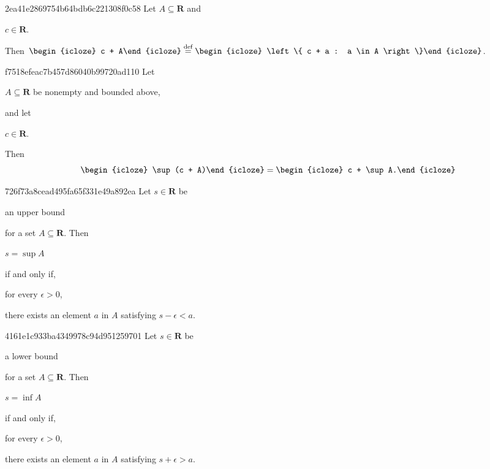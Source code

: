 \begin{note}{2ea41e2869754b64bdb6c221308f0c58}
    Let \({ A \subseteq \mathbf{R} }\) and \begin{icloze}{3}\({ c \in \mathbf{R} }\).\end{icloze}
    Then \({ \begin{icloze}{2}c + A\end{icloze} \overset{\text{def}}= \begin{icloze}{1}\left\{ c + a : a \in A \right\}\end{icloze} }\).
\end{note}

\begin{note}{f7518efeac7b457d86040b99720ad110}
    Let \begin{icloze}{2}\({ A \subseteq \mathbf{R} }\) be nonempty and bounded above,\end{icloze} and let \begin{icloze}{4}\({ c \in \mathbf{R} }\).\end{icloze}
    Then
    \[
        \begin{icloze}{3}\sup(c + A)\end{icloze} = \begin{icloze}{1}c + \sup A.\end{icloze}
    \]
\end{note}

\begin{note}{726f73a8cead495fa65f331e49a892ea}
    Let \({ s \in \mathbf{R} }\) be \begin{icloze}{5}an upper bound\end{icloze} for a set \({ A \subseteq \mathbf{R} }\).
    Then \begin{icloze}{3}\({ s = \sup A }\)\end{icloze} \begin{icloze}{4}if and only if,\end{icloze} \begin{icloze}{2}for every \({ \epsilon > 0 }\),\end{icloze} \begin{icloze}{1}there exists an element \({ a }\) in \({ A }\) satisfying \({ s - \epsilon < a }\).\end{icloze}
\end{note}

\begin{note}{4161e1c933ba4349978c94d951259701}
    Let \({ s \in \mathbf{R} }\) be \begin{icloze}{5}a lower bound\end{icloze} for a set \({ A \subseteq \mathbf{R} }\).
    Then \begin{icloze}{3}\({ s = \inf A }\)\end{icloze} \begin{icloze}{4}if and only if,\end{icloze} \begin{icloze}{2}for every \({ \epsilon > 0 }\),\end{icloze} \begin{icloze}{1}there exists an element \({ a }\) in \({ A }\) satisfying \({ s + \epsilon > a }\).\end{icloze}
\end{note}

